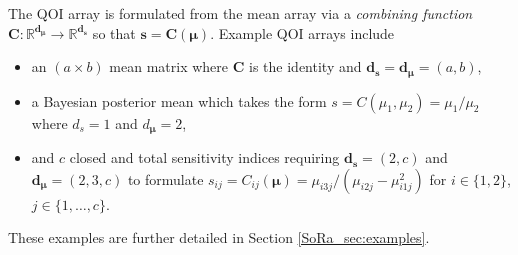 \documentclass[graybox]{svmult}
\begin{document}
The QOI array is formulated from the mean array via a \emph{combining function} $\boldsymbol{C}: \mathbb{R}^{\boldsymbol{d}_{\boldsymbol{\mu}}} \to \mathbb{R}^{\boldsymbol{d}_{\boldsymbol{s}}}$ so that $\boldsymbol{s} = \boldsymbol{C}(\boldsymbol{\mu})$.
Example QOI arrays include
\begin{itemize}
    \item an $(a \times b)$ mean matrix where $\boldsymbol{C}$ is the identity and $\boldsymbol{d}_{\boldsymbol{s}} = \boldsymbol{d}_{\boldsymbol{\mu}} = (a,b)$,
    \item a Bayesian posterior mean which takes the form $s = C(\mu_1,\mu_2) = \mu_1/\mu_2$ where $d_s = 1$ and $d_{\boldsymbol{\mu}} = 2$,
    \item and $c$ closed and total sensitivity indices requiring $\boldsymbol{d}_{\boldsymbol{s}} = (2,c)$ and $\boldsymbol{d}_{\boldsymbol{\mu}} = (2,3,c)$ to formulate $s_{ij} = C_{ij}(\boldsymbol{\mu}) =  \mu_{i3j}/(\mu_{i2j}-\mu_{i1j}^2)$ for $i \in \{1,2\}$, $j \in \{1,\dots,c\}$.
\end{itemize}
These examples are further detailed in Section \ref{SoRa_sec:examples}.
\end{document}
